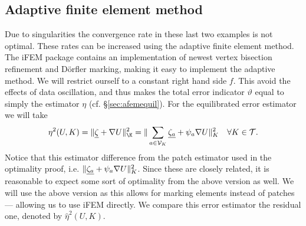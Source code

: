 \documentclass[thesis.tex]{subfiles}
\begin{document}
\subsection{Adaptive finite element method}
Due to singularities the convergence rate in these last two examples is not optimal. 
These rates can be increased using the adaptive finite element method. The iFEM package contains
an implementation of newest vertex bisection refinement and D\"orfler marking, making it easy
to implement the adaptive method. We will restrict ourself to a constant right hand side $f$. This
avoid the effects of data oscillation, and thus makes the total error indicator $\vartheta$ equal to 
simply the estimator $\eta$ (cf. \S\ref{sec:afemequil}). For the equilibrated error estimator we will
take
\[
  \eta^2(U, K) = \uanorm{ \v{\zeta} + \nabla U}^2_{\K} = \uanorm{\sum_{a \in \V_K} \v{\zeta_a} + \psi_a \nabla U}^2_{K} \quad \forall K \in \T.
\]
Notice that this estimator difference from the patch estimator used in the optimality proof, i.e. $\| \underline{\zeta_a} + \psi_a \nabla U \|^2_K$.
Since these are closely related, it is reasonable to expect some sort of optimality from the above version as well. We will use
the above version as this allows for marking elements instead of patches --- allowing us to use iFEM directly.
We compare this error estimator the residual one, denoted by $\hat \eta^2(U,K)$.
\end{document}
